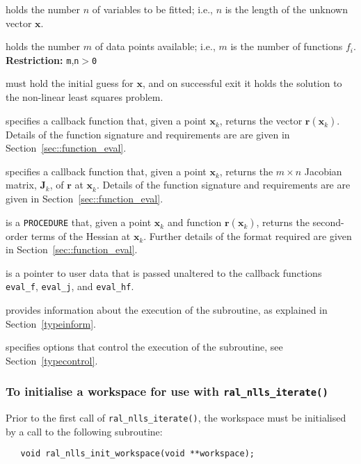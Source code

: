 \documentclass{spec}
\newcommand{\vx}{ {\bm x} } %
\newcommand{\vr}{ {\bm r} } %
\newcommand{\vJ}{ {\bm J} } %
\newcommand{\iter}[2][k]{ #2_{#1}^{}} %
\begin{document}
\begin{description}
 holds the number $n$ of 
variables to be fitted; i.e., $n$ is the length of the unknown vector $\bm x$.

 holds the number $m$ of 
data points available; i.e., $m$ is the number of functions $f_i$.
\textbf{Restriction:} \texttt{m},\texttt{n}$>$\texttt{0}

 must hold the initial guess for $\bm x$, and on 
successful exit it holds the solution to the non-linear least squares problem.

 specifies a callback function that, given a point $\iter{\vx}$,
returns the vector $\vr(\iter{\vx})$. Details of the function signature and
requirements are are given in Section~\ref{sec::function_eval}.

 specifies a callback function that, given a point $\iter{\vx}$, 
returns the $m \times n$ Jacobian matrix, $\iter{\vJ}$, of $\vr$ at $\iter{\vx}$. Details of the function signature and requirements are are given in
Section~\ref{sec::function_eval}.

 is a {\tt PROCEDURE} that, given a point $\iter{\vx}$
and function $\vr(\iter{\vx})$, returns the second-order terms of the Hessian at $\iter{\vx}$. 
Further details of the format required are given in Section~\ref{sec::function_eval}.

 is a pointer to user data that is passed unaltered to the callback
functions {\tt eval\_f}, {\tt eval\_j}, and {\tt eval\_hf}. 

 provides information about the execution
of the subroutine, as explained in Section~\ref{typeinform}.

 specifies options that control the execution of the subroutine,
see Section~\ref{typecontrol}.

\end{description}

\subsubsection{To initialise a workspace for use with \texttt{ral\_nlls\_iterate()}}

Prior to the first call of \texttt{ral\_nlls\_iterate()}, the workspace must be
initialised by a call to the following subroutine:
\begin{verbatim}
   void ral_nlls_init_workspace(void **workspace);
\end{verbatim}
\end{document}
